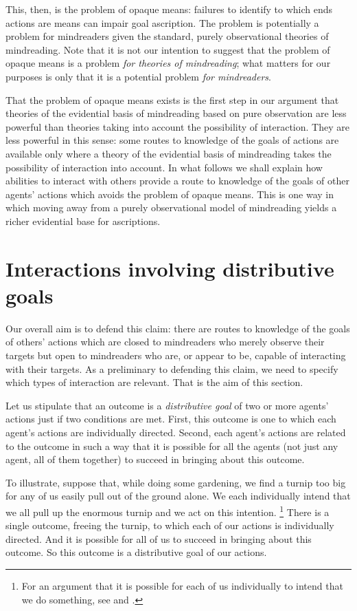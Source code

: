 \documentclass[12pt,a4paper]{extarticle}
\begin{document}
This, then, is the problem of opaque means:
failures to identify to which ends actions are means can impair goal ascription.
The problem is potentially a problem for mindreaders given the standard, purely observational theories of mindreading.
Note that it is not our intention to suggest that the problem of opaque means is a problem \emph{for theories of mindreading};
what matters for our purposes is only that it is a potential problem \emph{for mindreaders}.

That the problem of opaque means exists
is the first step in our argument
that 
theories of the evidential basis of mindreading based on pure observation 
are less powerful than theories taking into account the possibility of interaction.
They are less powerful in this sense: 
some routes to knowledge of the goals of actions are available only where a theory of the evidential basis of mindreading 
 takes the possibility of interaction into account.
In what follows we shall explain how abilities to interact with others provide a route to knowledge of the goals of other agents' actions  which avoids the problem of opaque means.
This is one way in which moving away from a purely observational model of mindreading yields a richer evidential base for ascriptions.


\section{Interactions involving distributive goals}
\label{sec:joint_action}
Our overall aim is to defend this claim:
there are routes to knowledge of the goals of others' actions
which are closed to
mindreaders who merely observe their targets
but open to 
mindreaders who are, or appear to be, capable of interacting with their targets.
As a preliminary to defending this claim,
we need to specify which types of interaction are relevant.
That is the aim of this section.

Let us stipulate that an outcome is a \emph{distributive goal} of two or more agents' actions just if two conditions are met.
\label{df:distributive_goal}
First, this outcome is  one to which each agent's actions are individually directed.
Second, each agent's actions are related to the outcome in such a way that it is possible for all the agents (not just any agent, all of them together) to succeed in bringing about this outcome.

To illustrate,
suppose that, while doing some gardening,
we find a turnip too big for any of us easily pull out of the ground alone.
We each individually intend that we all pull up the enormous turnip
and we act on this intention.%
\footnote{
For an argument that it is possible for each of us individually to intend that we do something, see \citet{Bratman:1999fr} and \citet[Chapter 2]{Bratman:2012fk}.
}
There is a single outcome,
freeing the turnip,
to which each of our actions is individually directed.
And it is possible for all of us to succeed in bringing about this outcome.
So this outcome is a distributive goal of our actions.
\end{document}
